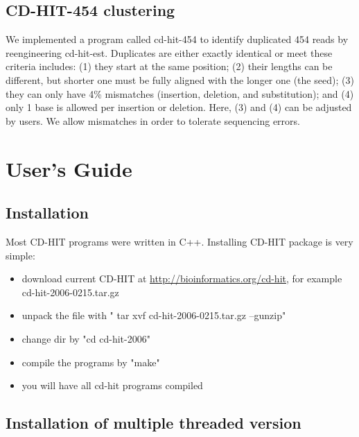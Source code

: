 \documentclass[12pt,a4paper]{article}
\begin{document}
\subsection{CD-HIT-454 clustering }

We implemented a program called cd-hit-454 to identify duplicated 454 reads by reengineering cd-hit-est. Duplicates are either exactly identical or meet these criteria includes: (1) they start at the same position; (2) their lengths can be different, but shorter one must be fully aligned with the longer one (the seed); (3) they can only have 4\% mismatches (insertion, deletion, and substitution); and (4) only 1 base is allowed per insertion or deletion. Here, (3) and (4) can be adjusted by users. We allow mismatches in order to tolerate sequencing errors.

 

\clearpage
\section{User's Guide }

\subsection{Installation }

 

Most CD-HIT programs were written in C++. Installing CD-HIT package is very simple:

\begin{itemize}
 \item  download current CD-HIT at \href{http:\slash \slash bioinformatics.org\slash cd-hit}{http:\slash \slash bioinformatics.org\slash cd-hit}, for example cd-hit-2006-0215.tar.gz

\item  unpack the file with " tar xvf cd-hit-2006-0215.tar.gz --gunzip"

\item  change dir by "cd cd-hit-2006"

\item  compile the programs by "make"

\item  you will have all cd-hit programs compiled

\end{itemize}

\subsection{Installation of multiple threaded version }
\end{document}
